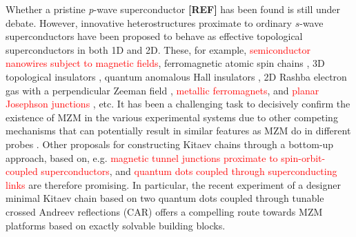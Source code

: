 \documentclass[aps,prb,showpacs,amsmath,twocolumn,amssymb,superscriptaddress]{revtex4-2}
\newcommand{\Red}[1]{\textcolor{red}{#1}}
\begin{document}
Whether a pristine \textit{p}-wave superconductor {\bf [REF]} has been found is still under debate. However, innovative heterostructures proximate to ordinary $s$-wave superconductors have been proposed to behave as effective topological superconductors in both 1D and 2D. These, for example, \Red{semiconductor nanowires subject to magnetic fields}\cite{mourikSignaturesMajoranaFermions2012, rokhinsonFractionalJosephsonEffect2012, dengAnomalousZeroBiasConductance2012}, ferromagnetic atomic spin chains \cite{choyMajoranaFermionsEmerging2011, brauneckerInterplayClassicalMagnetic2013, klinovajaTopologicalSuperconductivityMajorana2013,nadj-pergeObservationMajoranaFermions2014,schneiderPrecursorsMajoranaModes2022}, 3D topological insulators \cite{fuSuperconductingProximityEffect2008, hosurMajoranaModesEnds2011, potterEngineeringMathitipSuperconductor2011, veldhorstMagnetotransportInducedSuperconductivity2013}, quantum anomalous Hall insulators \cite{chenQuasionedimensionalQuantumAnomalous2018, zengQuantumAnomalousHall2018, xieCreatingLocalizedMajorana2021}, 2D Rashba electron gas with a perpendicular Zeeman field \cite{oregHelicalLiquidsMajorana2010, sauGenericNewPlatform2010, lutchynSearchMajoranaFermions2011, potterTopologicalSuperconductivityMajorana2012, nadj-pergeProposalRealizingMajorana2013}, \Red{metallic ferromagnets}, and \Red{planar Josephson junctions} \cite{black-schafferMajoranaFermionsSpinorbitcoupled2011, pientkaSignaturesTopologicalPhase2013, hellTwoDimensionalPlatformNetworks2017, scharfTuningTopologicalSuperconductivity2019}, etc. It has been a challenging task to decisively confirm the existence of MZM in the various experimental systems due to other competing mechanisms that can potentially result in similar features as MZM do in different probes \cite{xuExperimentalDetectionMajorana2015, albrechtExponentialProtectionZero2016, sunMajoranaZeroMode2016, wangEvidenceMajoranaBound2018, jackObservationMajoranaZero2019, fornieriEvidenceTopologicalSuperconductivity2019, renTopologicalSuperconductivityPhasecontrolled2019, mannaSignaturePairMajorana2020}. Other proposals for constructing Kitaev chains through a bottom-up approach, based on, e.g. \Red{magnetic tunnel junctions proximate to spin-orbit-coupled superconductors}, and \Red{quantum dots coupled through superconducting links} are therefore promising. In particular, the recent experiment of a designer minimal Kitaev chain based on two quantum dots coupled through tunable crossed Andreev reflections (CAR) offers a compelling route towards MZM platforms based on exactly solvable building blocks.
\end{document}

